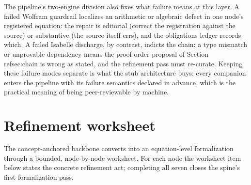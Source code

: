 \documentclass[11pt]{article}
\theoremstyle{remark}
\begin{document}
The pipeline's two-engine division also fixes what failure means at this layer. A failed Wolfram guardrail localizes an arithmetic or algebraic defect in one node's registered equation: the repair is editorial (correct the registration against the source) or substantive (the source itself errs), and the obligations ledger records which. A failed Isabelle discharge, by contrast, indicts the chain: a type mismatch or unprovable dependency means the proof-order proposal of Section~\\ref{sec:chain} is wrong as stated, and the refinement pass must re-curate. Keeping these failure modes separate is what the stub architecture buys: every companion enters the pipeline with its failure semantics declared in advance, which is the practical meaning of being peer-reviewable by machine.

\section{Refinement worksheet}
\label{sec:worksheet}

The concept-anchored backbone converts into an equation-level formalization through a bounded, node-by-node worksheet. For each node the worksheet item below states the concrete refinement act; completing all seven closes the spine's first formalization pass.
\end{document}
